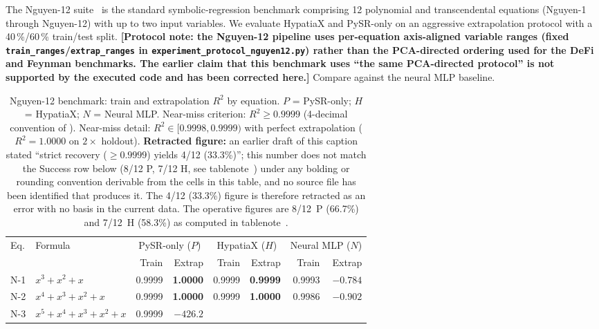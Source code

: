 \documentclass[twoside,11pt]{article}
\newcommand{\Rsq}{R^{2}}
\begin{document}
The Nguyen-12 suite~\citep{uy2011semantically} is the standard symbolic-regression
benchmark comprising 12 polynomial and transcendental equations (Nguyen-1 through
Nguyen-12) with up to two input variables.  We evaluate HypatiaX and PySR-only on
an aggressive extrapolation protocol with a 40\,\%/60\,\% train/test split.
\textbf{[Protocol note: the Nguyen-12 pipeline uses per-equation axis-aligned
variable ranges (fixed \texttt{train\_ranges}/\texttt{extrap\_ranges} in
\texttt{experiment\_protocol\_nguyen12.py}) rather than the PCA-directed
ordering used for the DeFi and Feynman benchmarks.  The earlier claim that
this benchmark uses ``the same PCA-directed protocol'' is not supported by
the executed code and has been corrected here.]}
Compare against the neural MLP baseline.

\begin{table}[h]
\centering
\caption{Nguyen-12 benchmark: train and extrapolation $\Rsq$ by equation.
$P$ = PySR-only; $H$ = HypatiaX; $N$ = Neural MLP.
Near-miss criterion: $\Rsq \ge 0.9999$ (4-decimal convention of
\citealt{uy2011semantically}).
Near-miss detail: $\Rsq\in[0.9998,0.9999)$ with perfect extrapolation
($\Rsq=1.0000$ on $2\times$ holdout). \textbf{Retracted figure:} an earlier
draft of this caption stated ``strict recovery ($\ge 0.9999$) yields 4/12
(33.3\%)''; this number does not match the Success row below (8/12 P, 7/12 H,
see tablenote~\ddag) under any bolding or rounding convention derivable
from the cells in this table, and no source file has been identified that
produces it. The 4/12 (33.3\%) figure is therefore retracted as an error
with no basis in the current data. The operative figures are 8/12~P
(66.7\%) and 7/12~H (58.3\%) as computed in tablenote~\ddag.}
\label{tab:nguyen12}
\begin{threeparttable}
\begin{tabular}{llrrrrrr}
\toprule
Eq. & Formula &
  \multicolumn{2}{c}{PySR-only ($P$)} &
  \multicolumn{2}{c}{HypatiaX ($H$)} &
  \multicolumn{2}{c}{Neural MLP ($N$)} \\
\cmidrule(lr){3-4}\cmidrule(lr){5-6}\cmidrule(lr){7-8}
 &  & Train & Extrap & Train & Extrap & Train & Extrap \\
\midrule
N-1  & $x^3 + x^2 + x$
  & 0.9999 & \textbf{1.0000}
  & 0.9999 & \textbf{0.9999}
  & 0.9993 & $-0.784$ \\
N-2  & $x^4 + x^3 + x^2 + x$
  & 0.9999 & \textbf{1.0000}
  & 0.9999 & \textbf{1.0000}
  & 0.9986 & $-0.902$ \\
N-3  & $x^5 + x^4 + x^3 + x^2 + x$
  & 0.9999 & \emph{$-426.2$}

\end{tabular}
\end{threeparttable}
\end{table}
\end{document}
